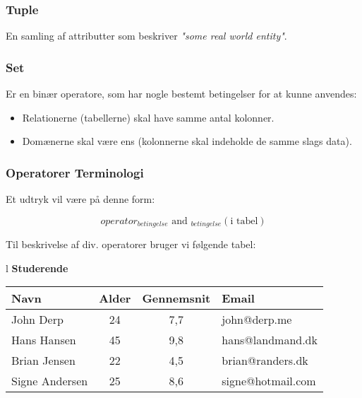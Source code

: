 \subsubsection{Tuple}
En samling af attributter som beskriver \textit{"some real world entity"}.

\subsubsection{Set}

Er en binær operatore, som har nogle bestemt betingelser for at kunne anvendes:

\begin{itemize}
	\item Relationerne (tabellerne) skal have samme antal kolonner.
	\item Domænerne skal være ens (kolonnerne skal indeholde de samme slags data).
\end{itemize}

\subsubsection{Operatorer Terminologi}

Et udtryk vil være på denne form:

\begin{equation*}
operator_{betingelse} \text{ and } _{betingelse} (\text{i tabel})
\end{equation*}

Til beskrivelse af div. operatorer bruger vi følgende tabel:

\setlength{\tabcolsep}{10pt}
\renewcommand{\arraystretch}{1.2}
\begin{center}
	\begin{tabular}{l}\label{tab:stud}
		\textbf{\large Studerende}	\\
		\begin{tabular}{|l|c|c|l|}		
			\hline
			\textbf{Navn}&\textbf{Alder}&\textbf{Gennemsnit}&\textbf{Email}\\
			\hline
			John Derp	& 24 & 7,7	& john@derp.me		\\
			\hline
			Hans Hansen	& 45 & 9,8	& hans@landmand.dk		\\
			\hline
			Brian Jensen& 22 & 4,5	& brian@randers.dk		\\
			\hline
			Signe Andersen	& 25 & 8,6	& signe@hotmail.com		\\
			\hline
		\end{tabular}
	\end{tabular}
\end{center}

